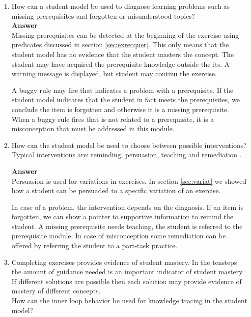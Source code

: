 \begin{enumerate}[Q1.]
\item How can a student model be used to diagnose learning problems such as missing prerequisites and forgotten or misunderstood topics?\\

\textbf{Answer}\\
Missing prerequisites can be detected at the beginning of the exercise using predicates discussed in section \ref{sec:exrecquer}.
This only means that the student model has no evidence that the student masters the concept.
The student may have acquired the prerequisite knowledge outside the \gls{its}.
A warning message is displayed, but student may continu the exercise.

A buggy rule may fire that indicates a problem with a prerequisite. 
If the student model indicates that the student in fact meets the prerequisites, we conclude the item is forgotten and otherwise it is a missing prerequisite.
When a buggy rule fires that is not related to a prerequisite, it is a misconception that must be addressed in this module. 


\item How can the student model be used to choose between possible interventions?\\
Typical interventions are: reminding, persuasion, teaching and remediation \citep{loops}.

\textbf{Answer}\\
Persuasion is used for variations in exercises.
In section \ref{sec:variat} we showed how a student can be persuaded to a specific variation of an exercise.

In case of a problem, the intervention depends on the diagnosis.
If an item is forgotten, we can show a pointer to supportive information to remind the student.
A missing prerequisite needs teaching, the student is referred to the prerequisite module.
In case of misconception some remediation can be offered by referring the student to a part-task practice.


\item  Completing exercises provides evidence of student mastery.
In the \gls{tensteps}  the amount of guidance needed is an important indicator of student mastery.
If different solutions are possible then each solution may provide evidence of mastery of different concepts.\\
How can the inner loop behavior be used for knowledge tracing in the student model?


\end{enumerate}
